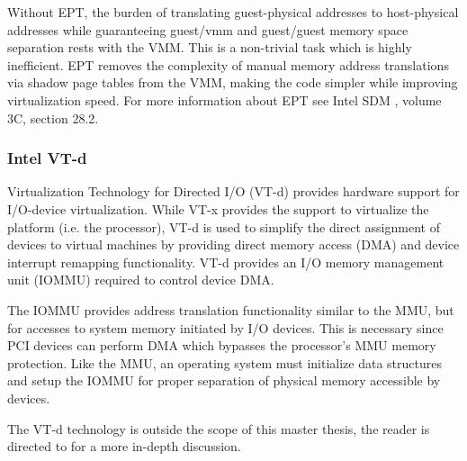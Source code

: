Without EPT, the burden of translating guest-physical addresses to
host-physical addresses while guaranteeing guest/vmm and guest/guest memory
space separation rests with the VMM. This is a non-trivial task which is highly
inefficient. EPT removes the complexity of manual memory address translations
via shadow page tables from the VMM, making the code simpler while improving
virtualization speed. For more information about EPT see Intel SDM
\cite{IntelSDM}, volume 3C, section 28.2.

\subsubsection{Intel VT-d}\label{subsubsec:vtd}
Virtualization Technology for Directed I/O (VT-d) provides hardware
support for I/O-device virtualization. While VT-x provides the support to
virtualize the platform (i.e. the processor), VT-d is used to simplify the
direct assignment of devices to virtual machines by providing direct memory
access (DMA) and device interrupt remapping functionality. VT-d
provides an I/O memory management unit (IOMMU) required to control
device DMA.

The IOMMU provides address translation functionality similar to the MMU, but
for accesses to system memory initiated by I/O devices.  This is necessary
since PCI devices can perform DMA which bypasses the processor's MMU memory
protection. Like the MMU, an operating system must initialize data structures
and setup the IOMMU for proper separation of physical memory accessible by
devices.

The VT-d technology is outside the scope of this master thesis, the reader is
directed to \cite{IntelVTd} for a more in-depth discussion.
